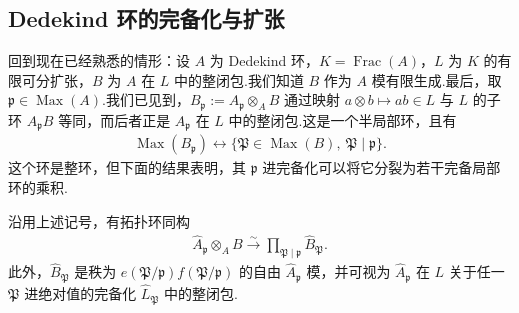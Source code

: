 \subsection{Dedekind 环的完备化与扩张}\label{sec:nt-4-2-4}
回到现在已经熟悉的情形：设 $A$ 为 Dedekind 环，$K=\operatorname{Frac}(A)$，$L$ 为 $K$ 的有限可分扩张，$B$ 为 $A$ 在 $L$ 中的整闭包.我们知道 $B$ 作为 $A$ 模有限生成.最后，取 $\mathfrak p\in\operatorname{Max}(A)$.我们已见到，$B_{\mathfrak p}:=A_{\mathfrak p}\otimes_A B$ 通过映射 $a\otimes b\longmapsto ab\in L$ 与 $L$ 的子环 $A_{\mathfrak p}B$ 等同，而后者正是 $A_{\mathfrak p}$ 在 $L$ 中的整闭包.这是一个半局部环，且有
\begin{align*}
\operatorname{Max}(B_{\mathfrak p})\longleftrightarrow
\{\mathfrak P\in\operatorname{Max}(B),\ \mathfrak P\mid\mathfrak p\}.
\end{align*}
这个环是整环，但下面的结果表明，其 $\mathfrak p$ 进完备化可以将它分裂为若干完备局部环的乘积.
\begin{theorem*}
沿用上述记号，有拓扑环同构
\begin{align*}
\widehat A_{\mathfrak p}\otimes_A B\xrightarrow{\sim}
\prod_{\mathfrak P\mid\mathfrak p}\widehat B_{\mathfrak P}.
\end{align*}
此外，$\widehat B_{\mathfrak P}$ 是秩为 $e(\mathfrak P/\mathfrak p)f(\mathfrak P/\mathfrak p)$ 的自由 $\widehat A_{\mathfrak p}$ 模，并可视为 $\widehat A_{\mathfrak p}$ 在 $L$ 关于任一 $\mathfrak P$ 进绝对值的完备化 $\widehat L_{\mathfrak P}$ 中的整闭包.
\end{theorem*}
